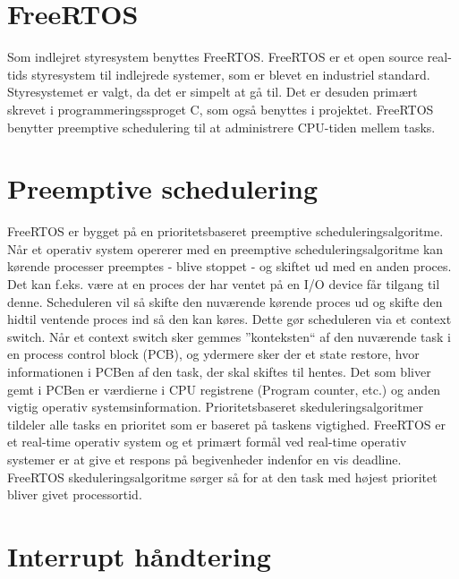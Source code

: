 \section{FreeRTOS}
Som indlejret styresystem benyttes FreeRTOS. 
FreeRTOS er et open source real-tids styresystem til indlejrede systemer, som er blevet en industriel standard. 
Styresystemet er valgt, da det er simpelt at gå til. 
Det er desuden primært skrevet i programmeringssproget C, som også benyttes i projektet. 
FreeRTOS benytter preemptive schedulering til at administrere CPU-tiden mellem tasks. 

\section{Preemptive schedulering}
FreeRTOS er bygget på en prioritetsbaseret preemptive scheduleringsalgoritme.\newline
Når et operativ system opererer med en preemptive scheduleringsalgoritme kan kørende processer preemptes - blive stoppet - og skiftet ud med en anden proces.\newline
Det kan f.eks. være at en proces der har ventet på en I/O device får tilgang til denne.
Scheduleren vil så skifte den nuværende kørende proces ud og skifte den hidtil ventende proces ind så den kan køres.
Dette gør scheduleren via et context switch.\newline
Når et context switch sker gemmes ''konteksten`` af den nuværende task i en process control block (PCB), og ydermere sker der et state restore, hvor informationen i PCBen af den task, der skal skiftes til hentes.
Det som bliver gemt i PCBen er værdierne i CPU registrene (Program counter, etc.) og anden vigtig operativ systemsinformation.\newline
Prioritetsbaseret skeduleringsalgoritmer tildeler alle tasks en prioritet som er baseret på taskens vigtighed.\newline
FreeRTOS er et real-time operativ system og et primært formål ved real-time operativ systemer er at give et respons på begivenheder indenfor en vis deadline.
FreeRTOS skeduleringsalgoritme sørger så for at den task med højest prioritet bliver givet processortid.

\section{Interrupt håndtering}
